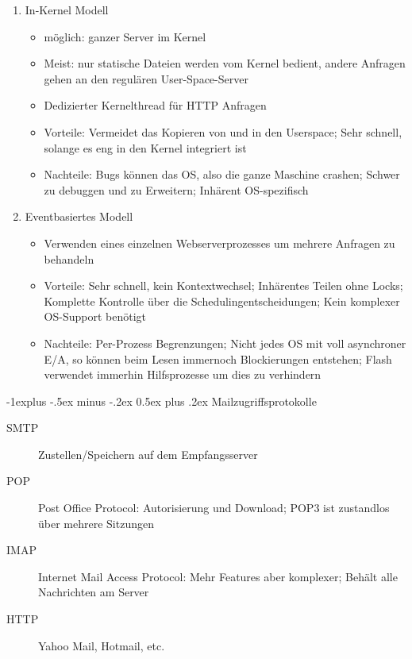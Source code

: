 \documentclass[10pt,landscape]{article}
\makeatletter
\renewcommand{\subsection}{\@startsection{subsection}{2}{0mm}%
                                {-1explus -.5ex minus -.2ex}%
                                {0.5ex plus .2ex}%
                                {\normalfont\normalsize\bfseries}}
\makeatother
\begin{document}
\begin{multicols}{3}
\begin{enumerate}
\begin{itemize}
    \end{itemize}
    \item In-Kernel Modell
    \begin{itemize}
        \item möglich: ganzer Server im Kernel
        \item Meist: nur statische Dateien werden vom Kernel bedient, andere Anfragen gehen an den regulären User-Space-Server
        \item Dedizierter Kernelthread für HTTP Anfragen
        \item Vorteile: Vermeidet das Kopieren von und in den Userspace; Sehr schnell, solange es eng in den Kernel integriert ist
        \item Nachteile: Bugs können das OS, also die ganze Maschine crashen; Schwer zu debuggen und zu Erweitern; Inhärent OS-spezifisch
    \end{itemize}
    \item Eventbasiertes Modell
    \begin{itemize}
        \item Verwenden eines einzelnen Webserverprozesses um mehrere Anfragen zu behandeln
        \item Vorteile: Sehr schnell, kein Kontextwechsel; Inhärentes Teilen ohne Locks; Komplette Kontrolle über die Schedulingentscheidungen; Kein komplexer OS-Support benötigt
        \item Nachteile: Per-Prozess Begrenzungen; Nicht jedes OS mit voll asynchroner E/A, so können beim Lesen immernoch Blockierungen entstehen; Flash verwendet immerhin Hilfsprozesse um dies zu verhindern
    \end{itemize}
\end{enumerate}

\subsection{Mailzugriffsprotokolle}
\begin{description}
    \item[SMTP] Zustellen/Speichern auf dem Empfangsserver
    \item[POP] Post Office Protocol: Autorisierung und Download; POP3 ist zustandlos über mehrere Sitzungen
    \item[IMAP] Internet Mail Access Protocol: Mehr Features aber komplexer; Behält alle Nachrichten am Server
    \item[HTTP] Yahoo Mail, Hotmail, etc.
\end{description}


\end{multicols}
\end{document}
